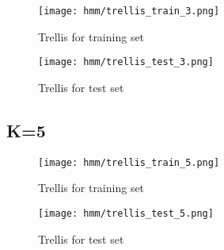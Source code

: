 \documentclass[12pt,a4paper]{article}
\begin{document}
\begin{figure}[H]
  \centering
  \texttt{[image: hmm/trellis\_train\_3.png]}
  \caption{Trellis for training set}  
\end{figure}

\begin{figure}[H]
  \centering
  \texttt{[image: hmm/trellis\_test\_3.png]}
  \caption{Trellis for test set}  
\end{figure}

\subsection{K=5}

\begin{figure}[H]
  \centering
  \texttt{[image: hmm/trellis\_train\_5.png]}
  \caption{Trellis for training set}  
\end{figure}

\begin{figure}[H]
  \centering
  \texttt{[image: hmm/trellis\_test\_5.png]}
  \caption{Trellis for test set}  
\end{figure}
\end{document}
